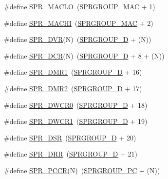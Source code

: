 \begin{DoxyCompactItemize}
\item 
\#define \hyperlink{spr-defs_8h_a8125d717b97e6f53428b85bc6e84bad1}{\-S\-P\-R\-\_\-\-M\-A\-C\-L\-O}~(\hyperlink{spr-defs_8h_a1a77decacd91763986a1c6aa1a984945}{\-S\-P\-R\-G\-R\-O\-U\-P\-\_\-\-M\-A\-C} + 1)
\item 
\#define \hyperlink{spr-defs_8h_a4cfb8b220690f81facd335763da14eb0}{\-S\-P\-R\-\_\-\-M\-A\-C\-H\-I}~(\hyperlink{spr-defs_8h_a1a77decacd91763986a1c6aa1a984945}{\-S\-P\-R\-G\-R\-O\-U\-P\-\_\-\-M\-A\-C} + 2)
\item 
\#define \hyperlink{spr-defs_8h_ac05f60929edc27952e384dd4b25698fe}{\-S\-P\-R\-\_\-\-D\-V\-R}(\-N)~(\hyperlink{spr-defs_8h_ac846f8d5c22e7e1089db0cba762dd659}{\-S\-P\-R\-G\-R\-O\-U\-P\-\_\-\-D} + (\-N))
\item 
\#define \hyperlink{spr-defs_8h_af0a2d56d649e49109abffb15db69b803}{\-S\-P\-R\-\_\-\-D\-C\-R}(\-N)~(\hyperlink{spr-defs_8h_ac846f8d5c22e7e1089db0cba762dd659}{\-S\-P\-R\-G\-R\-O\-U\-P\-\_\-\-D} + 8 + (\-N))
\item 
\#define \hyperlink{spr-defs_8h_a7ff7ae4beea743318273ddc074d2a926}{\-S\-P\-R\-\_\-\-D\-M\-R1}~(\hyperlink{spr-defs_8h_ac846f8d5c22e7e1089db0cba762dd659}{\-S\-P\-R\-G\-R\-O\-U\-P\-\_\-\-D} + 16)
\item 
\#define \hyperlink{spr-defs_8h_a9fb6123b08fbf721b18e848823085301}{\-S\-P\-R\-\_\-\-D\-M\-R2}~(\hyperlink{spr-defs_8h_ac846f8d5c22e7e1089db0cba762dd659}{\-S\-P\-R\-G\-R\-O\-U\-P\-\_\-\-D} + 17)
\item 
\#define \hyperlink{spr-defs_8h_abf5548c6834aaaad6dc3c1c4ee297db7}{\-S\-P\-R\-\_\-\-D\-W\-C\-R0}~(\hyperlink{spr-defs_8h_ac846f8d5c22e7e1089db0cba762dd659}{\-S\-P\-R\-G\-R\-O\-U\-P\-\_\-\-D} + 18)
\item 
\#define \hyperlink{spr-defs_8h_a0d2af0ba8c47de342b7bb8045eb4bf26}{\-S\-P\-R\-\_\-\-D\-W\-C\-R1}~(\hyperlink{spr-defs_8h_ac846f8d5c22e7e1089db0cba762dd659}{\-S\-P\-R\-G\-R\-O\-U\-P\-\_\-\-D} + 19)
\item 
\#define \hyperlink{spr-defs_8h_af3fd6e3b3f8931ed6194817864f59127}{\-S\-P\-R\-\_\-\-D\-S\-R}~(\hyperlink{spr-defs_8h_ac846f8d5c22e7e1089db0cba762dd659}{\-S\-P\-R\-G\-R\-O\-U\-P\-\_\-\-D} + 20)
\item 
\#define \hyperlink{spr-defs_8h_ad8f1a3d9041dc25c59b9500315f26b8f}{\-S\-P\-R\-\_\-\-D\-R\-R}~(\hyperlink{spr-defs_8h_ac846f8d5c22e7e1089db0cba762dd659}{\-S\-P\-R\-G\-R\-O\-U\-P\-\_\-\-D} + 21)
\item 
\#define \hyperlink{spr-defs_8h_a494d15db838419691c8fc87d1215b918}{\-S\-P\-R\-\_\-\-P\-C\-C\-R}(\-N)~(\hyperlink{spr-defs_8h_a018a0154cb10baa381263b907997d956}{\-S\-P\-R\-G\-R\-O\-U\-P\-\_\-\-P\-C} + (\-N))

\end{DoxyCompactItemize}
